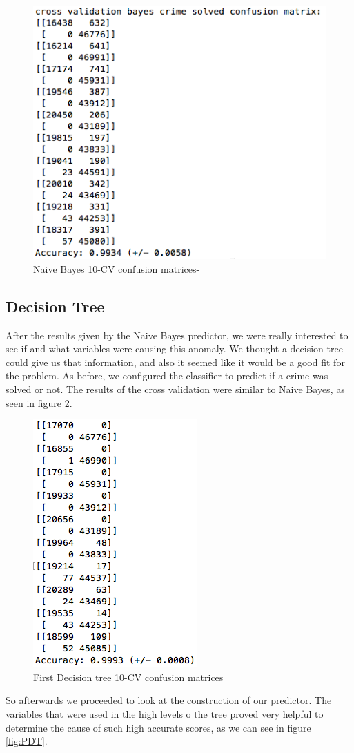 \documentclass[12pt]{report}
\begin{document}
\begin{figure}[h]
  \centering
  \includegraphics[width=0.5\linewidth]{../Images/CVNaiveBayesCM}
  \caption{Naive Bayes 10-CV confusion matrices-}
  \label{fig:CVNBCM}
\end{figure}

\subsection{Decision Tree}

After the results given by the Naive Bayes predictor, we were really interested to see if and what variables were causing this anomaly. We thought a decision tree could give us that information, and also it seemed like it would be a good fit for the problem. As before, we configured the classifier to predict if a crime was solved or not. The results of the cross validation were similar to Naive Bayes, as seen in figure \ref{fig:PDTCM}.

\begin{figure}[h]
  \centering
  \includegraphics[width=0.25\linewidth]{../Images/PerfectDecisionTreeCM}
  \caption{First Decision tree 10-CV confusion matrices}
  \label{fig:PDTCM}
\end{figure}


So afterwards we proceeded to look at the construction of our predictor. The variables that were used in the high levels o the tree proved very helpful to determine the cause of such high accurate scores, as we can see in figure \ref{fig:PDT}.
\end{document}
